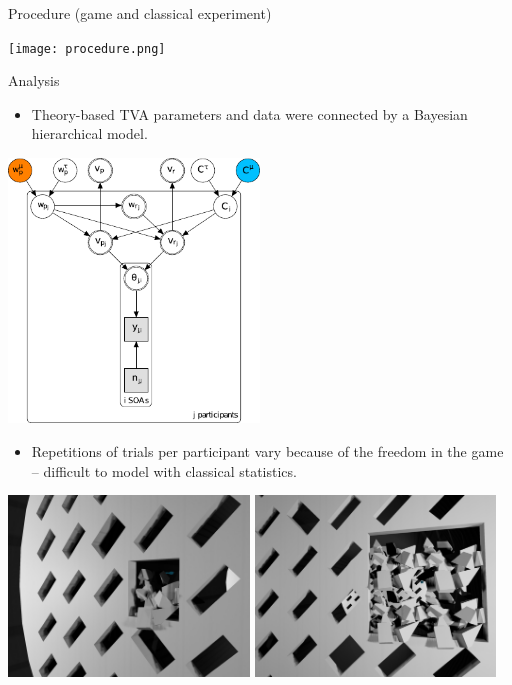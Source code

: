 \documentclass[a0paper,portrait]{baposter}
\begin{document}
\begin{poster}
		\begin{posterbox}[name=procedure,span=2,column=0,row=2, below=game]{Procedure (game and classical experiment)}
			\begin{center}
				\texttt{[image: procedure.png]}
			\end{center}
		\end{posterbox}
		
		\begin{posterbox}[name=results,span=1,column=2,row=0]{Analysis}
			\begin{itemize}
				\item Theory-based TVA parameters and data were connected by a Bayesian hierarchical model.
			\end{itemize}
			\begin{center}
				\includegraphics[width=0.5\textwidth]{graphmod.pdf}
			\end{center}
			\begin{itemize}
				\item Repetitions of trials per participant vary because of the freedom in the game -- difficult to model with classical statistics.
			\end{itemize}
			
			\begin{center}
				\includegraphics[width=0.48\textwidth]{unclear.jpg}
				\includegraphics[width=0.48\textwidth]{unclear2.jpg}
			\end{center}
			

\end{posterbox}
\end{poster}
\end{document}
